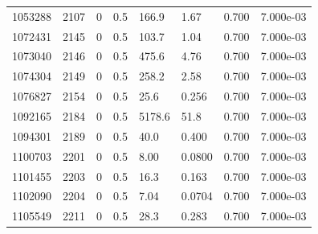 \documentclass[preview]{standalone}
\begin{document}
{{{\begin{tabular}{L{1.2cm}C{1.2cm} C{0.3cm}C{0.5cm} C{1.4cm}C{1.4cm} C{1.4cm}C{1.4cm}}
  1053288  &  2107  & 0     & 0.5 &  166.9  & 1.67  & 0.700 &  7.000e-03   \\ 
  1072431  &  2145  & 0     & 0.5 &  103.7  & 1.04  & 0.700 &  7.000e-03   \\ 
  1073040  &  2146  & 0     & 0.5 &  475.6  & 4.76  & 0.700 &  7.000e-03   \\ 
  1074304  &  2149  & 0     & 0.5 &  258.2  & 2.58  & 0.700 &  7.000e-03   \\ 
  1076827  &  2154  & 0     & 0.5 &  25.6  & 0.256  & 0.700 &  7.000e-03   \\ 
  1092165  &  2184  & 0     & 0.5 &  5178.6  & 51.8  & 0.700 &  7.000e-03   \\ 
  1094301  &  2189  & 0     & 0.5 &  40.0  & 0.400  & 0.700 &  7.000e-03   \\ 
  1100703  &  2201  & 0     & 0.5 &  8.00  & 0.0800  & 0.700 &  7.000e-03   \\ 
  1101455  &  2203  & 0     & 0.5 &  16.3  & 0.163  & 0.700 &  7.000e-03   \\ 
  1102090  &  2204  & 0     & 0.5 &  7.04  & 0.0704  & 0.700 &  7.000e-03   \\ 
  1105549  &  2211  & 0     & 0.5 &  28.3  & 0.283  & 0.700 &  7.000e-03   \\ 
\hline 
\end{tabular} 

}}}
\end{document}
